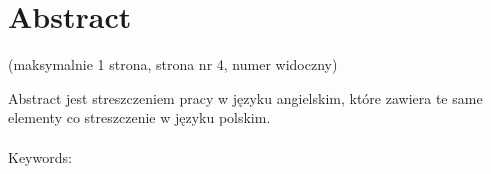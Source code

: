 \chapter*{Abstract}

(maksymalnie 1 strona, strona nr 4, numer widoczny)

Abstract jest streszczeniem pracy w języku angielskim, które zawiera te same elementy co streszczenie w języku polskim.
\\\\
Keywords:

